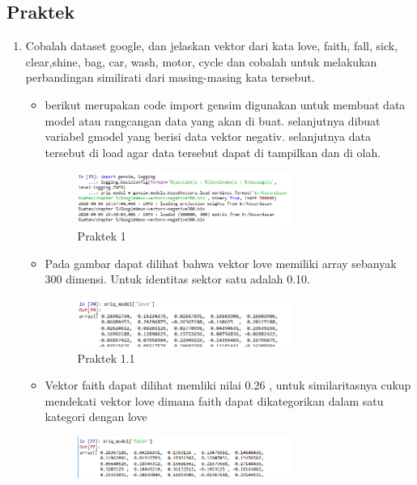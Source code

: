 \subsection{Praktek}
\begin{enumerate}
	\item Cobalah dataset google, dan jelaskan vektor dari kata love, faith, fall, sick, clear,shine, bag, car, wash, motor, cycle dan cobalah untuk melakukan perbandingan similirati dari masing-masing kata tersebut.
	\begin{itemize}
		\item berikut merupakan code import gensim digunakan untuk membuat data model atau rangcangan data yang akan di buat. selanjutnya dibuat variabel gmodel yang berisi data vektor negativ. selanjutnya data tersebut di load agar data tersebut dapat di tampilkan dan di olah.
		\hfill\break
		
		\begin{figure}[H]
			\includegraphics[width=7cm]{figures/1174087/5/7.png}
			\centering
			\caption{Praktek 1}
		\end{figure}
		\item Pada gambar dapat dilihat bahwa vektor love memiliki array sebanyak 300 dimensi. Untuk identitas sektor satu adalah 0.10.
		\hfill\break
		
		\begin{figure}[H]
			\includegraphics[width=7cm]{figures/1174087/5/8.png}
			\centering
			\caption{Praktek 1.1}
		\end{figure}
		\item Vektor faith dapat dilihat memliki nilai 0.26 , untuk similaritasnya cukup mendekati vektor love dimana faith dapat dikategorikan dalam satu kategori dengan love
		\hfill\break
		
		\begin{figure}[H]
			\includegraphics[width=7cm]{figures/1174087/5/9.png}

\end{figure}
\end{itemize}
\end{enumerate}
